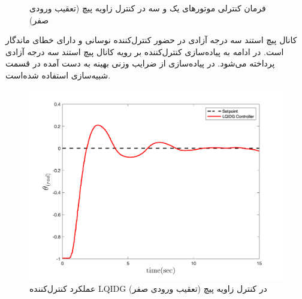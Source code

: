 \documentclass{CCI2020}
\begin{document}
	\begin{figure}[H]
		\centering
		\caption{فرمان کنترلی موتورهای یک و سه در کنترل زاویه پیچ (تعقیب ورودی صفر)}
	\end{figure}





کانال پیچ استند سه درجه آزادی در حضور کنترل‌کننده  نوسانی و دارای خطای ماندگار است.
در ادامه به پیاده‌سازی کنترل‌کننده  بر رویه کانال پیچ استند سه درجه آزادی پرداخته می‌شود.
در پیاده‌سازی از ضرایب وزنی بهینه به دست آمده در قسمت شبیه‌سازی استفاده شده‌است.
\begin{figure}[H]
	\includegraphics[width=.48\linewidth]{../Figures/Calibration/LQIDG/Pitch/lqidg_pitch.png}
	\centering
	\caption{عملكرد کنترل‌کننده  LQIDG در کنترل زاويه پیچ (تعقیب ورودی صفر)}
\end{figure}
\end{document}
